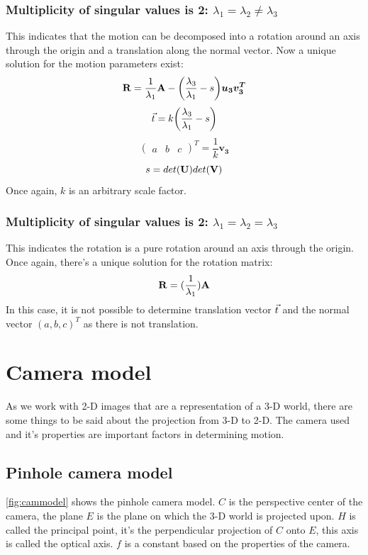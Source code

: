 \subsubsection{Multiplicity of singular values is 2: $\lambda_1 = \lambda_2 \neq \lambda_3$}
This indicates that the motion can be decomposed into a rotation around an axis through the origin and a translation along the normal vector. Now a unique solution for the motion parameters exist:
\begin{equation*}
    \mathbf{R} = \frac{1}{\lambda_1}\mathbf{A}-\biggl(\frac{\lambda_3}{\lambda_1}-s\biggr)\boldsymbol{u_3}\boldsymbol{v_3^T}
\end{equation*}
\begin{equation*}
    \vec t = k\biggl(\frac{\lambda_3}{\lambda_1}-s\biggr)
\end{equation*}
\begin{equation*}
    \begin{pmatrix}
        a & b & c
    \end{pmatrix}^T = \frac{1}{k}\boldsymbol{v_3}
\end{equation*}
\begin{equation*}
    s = det(\mathbf{U}) det(\mathbf{V})
\end{equation*}
Once again, $k$ is an arbitrary scale factor.
\subsubsection{Multiplicity of singular values is 2: $\lambda_1 = \lambda_2 = \lambda_3$}
This indicates the rotation is a pure rotation around an axis through the origin. Once again, there's a unique solution for the rotation matrix:
\begin{equation*}
    \mathbf{R} = (\frac{1}{\lambda_1})\mathbf{A}
\end{equation*}
In this case, it is not possible to determine translation vector $\vec t$ and the normal vector $(a, b, c)^T$ as there is not translation.


\section{Camera model}
As we work with 2-D images that are a representation of a 3-D world, there are some things to be said about the projection from 3-D to 2-D. The camera used and it's properties are important factors in determining motion.

\subsection{Pinhole camera model}
\autoref{fig:cammodel} shows the pinhole camera model. $C$ is the perspective center of the camera, the plane $E$ is the plane on which the 3-D world is projected upon. $H$ is called the principal point, it's the perpendicular projection of $C$ onto $E$, this axis is called the optical axis. $f$ is a constant based on the properties of the camera.

